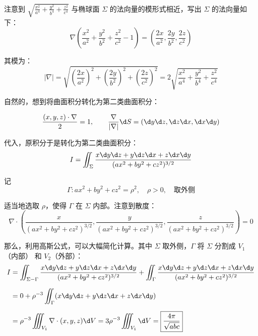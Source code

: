 \documentclass[12pt, a4paper, oneside, UTF8]{ctexbook}
\begin{document}
\begin{solution}
    注意到 $\sqrt{\displaystyle\frac{x^2}{a^4}+\frac{y^2}{b^4}+\frac{z^2}{c^4}}$ 与椭球面 $\Sigma$ 的法向量的模形式相近，写出 $\Sigma$ 的法向量如下：
    \[ \nabla\left(\frac{x^2}{a^2}+\frac{y^2}{b^2}+\frac{z^2}{c^2}-1\right) = \left(\frac{2x}{a^2}, \frac{2y}{b^2}, \frac{2z}{c^2}\right) \]

    其模为：
    \[ |\nabla| = \sqrt{\left(\frac{2x}{a^2}\right)^2 + \left(\frac{2y}{b^2}\right)^2 + \left(\frac{2z}{c^2}\right)^2} = 2\sqrt{\frac{x^2}{a^4}+\frac{y^2}{b^4}+\frac{z^2}{c^4}} \]

    自然的，想到将曲面积分转化为第二类曲面积分：

    \[\frac{(x, y, z)\cdot\nabla}{2}=1,\qquad \frac{\nabla}{|\nabla|}\d S = \left(\d y\d z,\d z\d x,\d x\d y\right)\]

    代入，原积分于是转化为第二类曲面积分：
    \[ I = \iint_\Sigma \frac{x\d y\d z+y\d z\d x+z\d x\d y}{(ax^2+by^2+cz^2)^{3/2}} \]

    记
    \[\Gamma: ax^2+by^2+cz^2 = \rho^2,\quad \rho > 0,\quad\text{取外侧}\]

    适当地选取 $\rho$，使得 $\Gamma$ 在 $\Sigma$ 内部。注意到散度：
    \[\nabla\cdot \left(\frac{x}{(ax^2+by^2+cz^2)^{3/2}}, \frac{y}{(ax^2+by^2+cz^2)^{3/2}}, \frac{z}{(ax^2+by^2+cz^2)^{3/2}}\right) = 0\]

    那么，利用高斯公式，可以大幅简化计算。其中 $\Sigma$ 取外侧，$\Gamma$ 将 $\Sigma$ 分割成 $V_1$（内部） 和 $V_2$（外部）：
    \begin{align*}
        I &= \iint_{\Sigma-\Gamma}\frac{x\d y\d z+y\d z\d x+z\d x\d y}{(ax^2+by^2+cz^2)^{3/2}} + \iint_{\Gamma}\frac{x\d y\d z+y\d z\d x+z\d x\d y}{(ax^2+by^2+cz^2)^{3/2}} \\[0.6em]
        &= 0 + \rho^{-3} \iint_{\Gamma} (x\d y\d z+y\d z\d x+z\d x\d y) \\[0.6em]
        &= \rho^{-3} \iiint_{V_1} \nabla\cdot (x,y,z) \d V = 3\rho^{-3} \iiint_{V_1} \d V = \boxed{\frac{4\pi}{\sqrt{abc}}}
    \end{align*}
\end{solution}
\ifx\allfiles\undefined
\end{document}
